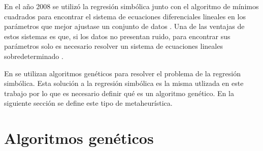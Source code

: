 En el año 2008 se utilizó la regresión simbólica junto con el algoritmo de mínimos cuadrados para encontrar el sistema de ecuaciones diferenciales lineales en los parámetros que mejor ajustase un conjunto de datos \cite{iba2008inference}. Una de las ventajas de estos sistemas es que, si los datos no presentan ruido, para encontrar sus parámetros solo es necesario resolver un sistema de ecuaciones lineales sobredeterminado \cite{myers2012generalized}.




En \cite{koza1994genetic, iba2008inference, gaucel2014learning, kronberger2019identification} se utilizan algoritmos genéticos para resolver el problema de la regresión simbólica. Esta solución a la regresión simbólica es la misma utlizada en este trabajo por lo que es necesario definir qué es un algoritmo genético. En la siguiente sección se define este tipo de metaheurística.

\section{Algoritmos genéticos}\label{section:genetic_algorithm}

